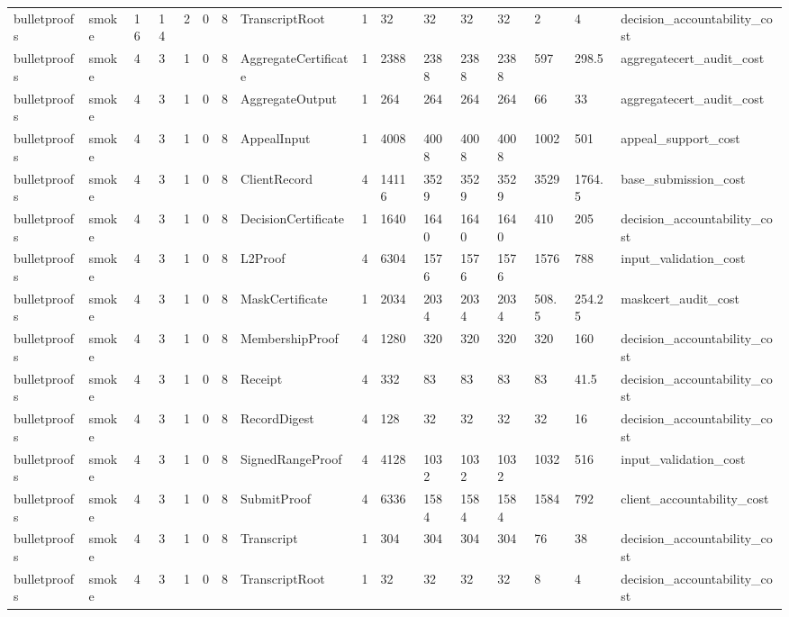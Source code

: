 \begin{table}[t]
\begin{tabular}{llllllllllllllll}
bulletproofs & smoke & 16 & 14 & 2 & 0 & 8 & TranscriptRoot & 1 & 32 & 32 & 32 & 32 & 2 & 4 & decision\_accountability\_cost \\
bulletproofs & smoke & 4 & 3 & 1 & 0 & 8 & AggregateCertificate & 1 & 2388 & 2388 & 2388 & 2388 & 597 & 298.5 & aggregatecert\_audit\_cost \\
bulletproofs & smoke & 4 & 3 & 1 & 0 & 8 & AggregateOutput & 1 & 264 & 264 & 264 & 264 & 66 & 33 & aggregatecert\_audit\_cost \\
bulletproofs & smoke & 4 & 3 & 1 & 0 & 8 & AppealInput & 1 & 4008 & 4008 & 4008 & 4008 & 1002 & 501 & appeal\_support\_cost \\
bulletproofs & smoke & 4 & 3 & 1 & 0 & 8 & ClientRecord & 4 & 14116 & 3529 & 3529 & 3529 & 3529 & 1764.5 & base\_submission\_cost \\
bulletproofs & smoke & 4 & 3 & 1 & 0 & 8 & DecisionCertificate & 1 & 1640 & 1640 & 1640 & 1640 & 410 & 205 & decision\_accountability\_cost \\
bulletproofs & smoke & 4 & 3 & 1 & 0 & 8 & L2Proof & 4 & 6304 & 1576 & 1576 & 1576 & 1576 & 788 & input\_validation\_cost \\
bulletproofs & smoke & 4 & 3 & 1 & 0 & 8 & MaskCertificate & 1 & 2034 & 2034 & 2034 & 2034 & 508.5 & 254.25 & maskcert\_audit\_cost \\
bulletproofs & smoke & 4 & 3 & 1 & 0 & 8 & MembershipProof & 4 & 1280 & 320 & 320 & 320 & 320 & 160 & decision\_accountability\_cost \\
bulletproofs & smoke & 4 & 3 & 1 & 0 & 8 & Receipt & 4 & 332 & 83 & 83 & 83 & 83 & 41.5 & decision\_accountability\_cost \\
bulletproofs & smoke & 4 & 3 & 1 & 0 & 8 & RecordDigest & 4 & 128 & 32 & 32 & 32 & 32 & 16 & decision\_accountability\_cost \\
bulletproofs & smoke & 4 & 3 & 1 & 0 & 8 & SignedRangeProof & 4 & 4128 & 1032 & 1032 & 1032 & 1032 & 516 & input\_validation\_cost \\
bulletproofs & smoke & 4 & 3 & 1 & 0 & 8 & SubmitProof & 4 & 6336 & 1584 & 1584 & 1584 & 1584 & 792 & client\_accountability\_cost \\
bulletproofs & smoke & 4 & 3 & 1 & 0 & 8 & Transcript & 1 & 304 & 304 & 304 & 304 & 76 & 38 & decision\_accountability\_cost \\
bulletproofs & smoke & 4 & 3 & 1 & 0 & 8 & TranscriptRoot & 1 & 32 & 32 & 32 & 32 & 8 & 4 & decision\_accountability\_cost \\
\bottomrule
\end{tabular}
\end{table}
